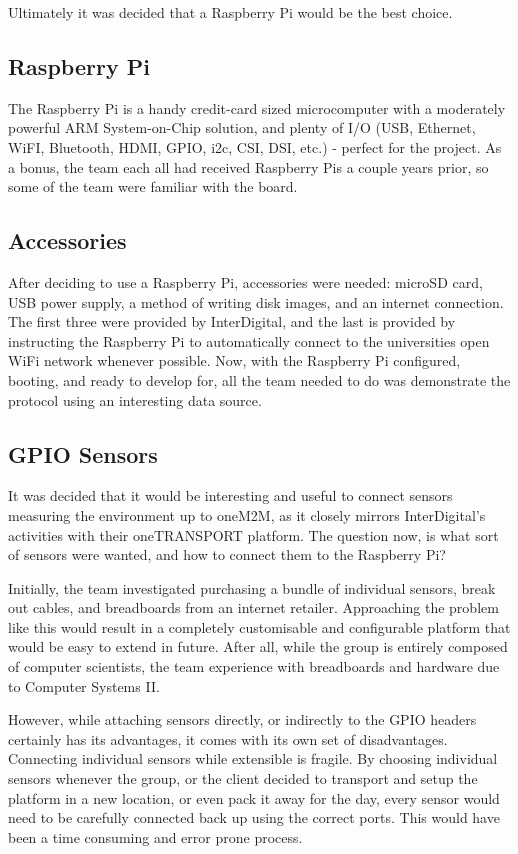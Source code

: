 Ultimately it was decided that a Raspberry Pi would be the best choice.

\subsection{Raspberry Pi}

The Raspberry Pi is a handy credit-card sized microcomputer with a moderately powerful ARM System-on-Chip solution, and plenty of I/O (USB, Ethernet, WiFI, Bluetooth, HDMI, GPIO, i2c, CSI, DSI, etc.) - perfect for the project. As a bonus, the team each all had received Raspberry Pis a couple years prior, so some of the team were familiar with the board.  

\subsection{Accessories}

After deciding to use a Raspberry Pi, accessories were needed: microSD card, USB power supply, a method of writing disk images, and an internet connection. The first three were provided by InterDigital, and the last is provided by instructing the Raspberry Pi to automatically connect to the universities open WiFi network whenever possible. Now, with the Raspberry Pi configured, booting, and ready to develop for, all the team needed to do was demonstrate the protocol using an interesting data source.

\subsection{GPIO Sensors}

It was decided that it would be interesting and useful to connect sensors measuring the environment up to oneM2M, as it closely mirrors InterDigital's activities with their oneTRANSPORT platform. The question now, is what sort of sensors were wanted, and how to connect them to the Raspberry Pi?

Initially, the team investigated purchasing a bundle of individual sensors, break out cables, and breadboards from an internet retailer. Approaching the problem like this would result in a completely customisable and configurable platform that would be easy to extend in future. After all, while the group is entirely composed of computer scientists, the team experience with breadboards and hardware due to Computer Systems II.

However, while attaching sensors directly, or indirectly to the GPIO headers certainly has its advantages, it comes with its own set of disadvantages. Connecting individual sensors while extensible is fragile. By choosing individual sensors whenever the group, or the client decided to transport and setup the platform in a new location, or even pack it away for the day, every sensor would need to be carefully connected back up using the correct ports. This would have been a time consuming and error prone process.

